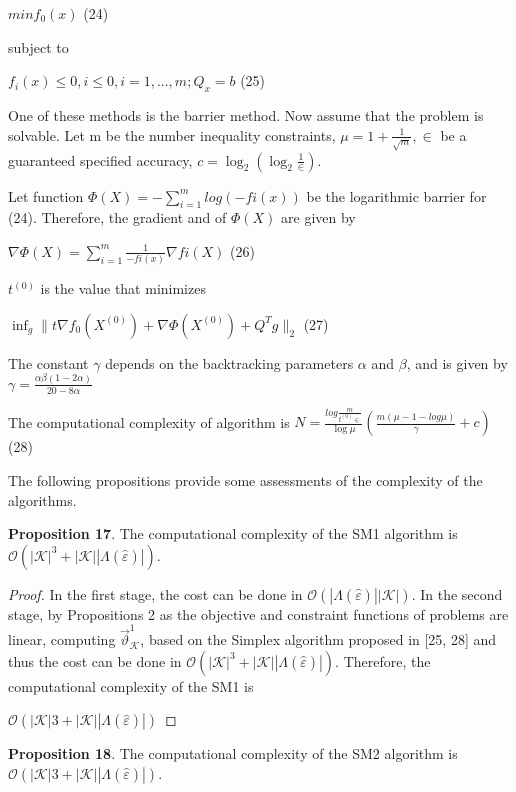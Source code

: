 \documentclass[]{iosart2c}
\begin{document}
$min f_0(x)$ (24)

subject to

$f_i(x) \le 0, i \le 0, i = 1, ...,m;Q_x = b$ (25)

One of these methods is the barrier method. Now assume that the problem is solvable. Let m be the number inequality constraints, $\mu = 1 + \frac{1}{\sqrt{m}}, \in$ be a 
guaranteed specified accuracy, $c = \log_2 (\log_2 \frac{1}{\in})$.

Let function $\Phi(X) = -\sum^m_{i=1} log(-fi(x))$ be the
logarithmic barrier for (24). Therefore, the gradient
and of $\Phi(X)$ are given by

$\nabla \Phi(X) = \sum^m_{i=1} \frac{1}{-fi(x)} \nabla fi(X)$ (26)

$t^{(0)}$ is the value that minimizes

$\inf_g \parallel t\nabla f_0 \left( X^{(0)} \right) + \nabla \Phi \left( X^{(0)} \right) + Q^T g \parallel _2$ (27)

The constant $\gamma$ depends on the backtracking
parameters $\alpha$ and $\beta$, and is given by $\gamma =  \frac{\alpha\beta(1-2\alpha)}{20-8\alpha}$

The computational complexity of algorithm is
$N = \frac{log \frac{m}{t^{(0)} \in}}{ \log\mu }
\left( \frac{m(\mu - 1 - log\mu)}{\gamma} + c \right)$ (28)

The following propositions provide some assessments of the complexity of the algorithms.

\textbf{Proposition 17}. The computational complexity of the
SM1 algorithm is $\mathcal{O}(|\mathcal{K}|^3 + |\mathcal{K}| |\Lambda(\hat{\varepsilon} )|)$.

\begin{proof}In the first stage, the cost can be done in
$\mathcal{O}(|\Lambda(\hat{\varepsilon})| |\mathcal{K}|)$. In the second stage, by Propositions
2 as the objective and constraint functions of problems
are linear, computing $\vec{\vartheta}^1_\mathcal{K}$, based on the Simplex
algorithm proposed in [25, 28] and thus the cost can
be done in $\mathcal{O}(|\mathcal{K}|^3 + |\mathcal{K}| |\Lambda(\hat{\varepsilon})|)$. Therefore, the computational
complexity of the SM1 is

$\mathcal{O}(|\mathcal{K}|3 + |\mathcal{K}| |\Lambda(\hat{\varepsilon})|)$
\end{proof}
\textbf{Proposition 18}. The computational complexity of the
SM2 algorithm is $\mathcal{O}(|\mathcal{K}|3 + |\mathcal{K}| |\Lambda(\hat{\varepsilon})|)$.
\end{document}
